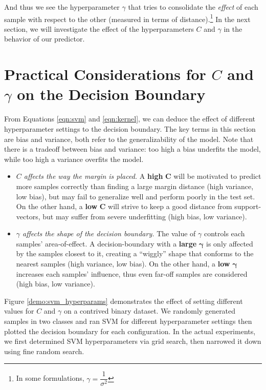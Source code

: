 \par And thus we see the hyperparameter $\gamma$ that tries to consolidate the
\emph{effect} of each sample with respect to the other (measured in terms of
distance).\footnote{In some formulations, $\gamma=\dfrac{1}{\sigma^2}$} In the
next section, we will investigate the effect of the hyperparameters $C$ and
$\gamma$ in the behavior of our predictor.

\section{Practical Considerations for $C$ and $\gamma$ on the Decision Boundary}

\par From Equations \ref{eqn:svm} and \ref{eqn:kernel}, we can deduce the
effect of different hyperparameter settings to the decision boundary. The key
terms in this section are bias and variance, both refer to the generalizability
of the model.  Note that there is a tradeoff between bias and variance: too
high a bias underfits the model, while too high a variance overfits the model.

\begin{itemize}
    \item \textit{$C$ affects the way the margin is placed.} A \textbf{high}
        $\mathbf{C}$ will be motivated to predict more samples correctly than
        finding a large margin distance (high variance, low bias), but may fail
        to generalize well and perform poorly in the test set. On the other
        hand, a \textbf{low} $\mathbf{C}$ will strive to keep a good distance
        from support-vectors, but may suffer from severe underfitting (high
        bias, low variance).
    \item \textit{$\gamma$ affects the shape of the decision boundary.} The
        value of $\gamma$ controls each samples' area-of-effect. A
        decision-boundary with a \textbf{large} $\mathbf{\gamma}$ is only
        affected by the samples closest to it, creating a ``wiggly'' shape that
        conforms to the nearest samples (high variance, low bias). On the other
        hand, a \textbf{low} $\mathbf{\gamma}$ increases each samples'
        influence, thus even far-off samples are considered (high bias, low
        variance).
\end{itemize}

\par Figure \ref{demo:svm_hyperparams} demonstrates the effect of setting
different values for $C$ and $\gamma$ on a contrived binary dataset. We
randomly generated samples in two classes and ran SVM for different
hyperparameter settings then plotted the decision boundary for each
configuration. In the actual experiments, we first determined SVM hyperparameters
via grid search, then narrowed it down using fine random search.

